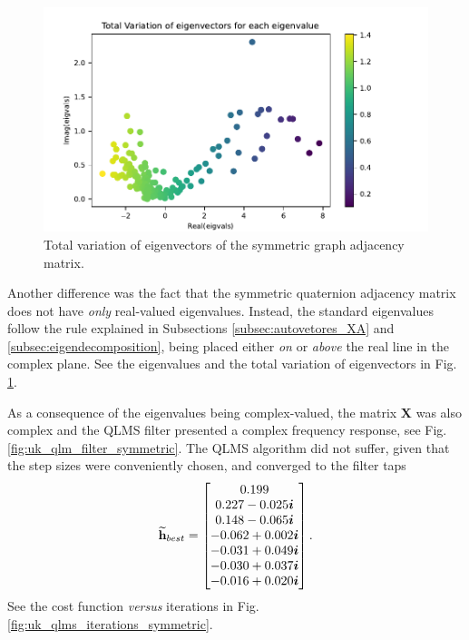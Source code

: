 \begin{figure}
    \centering
    \includegraphics[width=0.7\linewidth]{Figures/uk_example/uk_total_variation_symmetric.pdf}
    \caption{Total variation of eigenvectors of the symmetric graph adjacency matrix.}
    \label{fig:uk_total_variation_symmetric}
\end{figure}

Another difference was the fact that the symmetric quaternion adjacency matrix does not have \textit{only} real-valued eigenvalues. Instead, the standard eigenvalues follow the rule explained in Subsections \ref{subsec:autovetores_XA} and \ref{subsec:eigendecomposition}, being placed either \textit{on} or \textit{above} the real line in the complex plane. See the eigenvalues and the total variation of eigenvectors in Fig. \ref{fig:uk_total_variation_symmetric}.

As a consequence of the eigenvalues being complex-valued, the matrix $\mathbf{X}$ was also complex and the QLMS filter presented a complex frequency response, see Fig. \ref{fig:uk_qlm_filter_symmetric}.
The QLMS algorithm did not suffer, given that the step sizes were conveniently chosen, and converged to the filter taps
\begin{equation}
    \mathbf{\widetilde{h}}_{best} =
    \begin{bmatrix}
        0.199              \\
        0.227 -0.025\boldsymbol{i}    \\
        0.148 -0.065 \boldsymbol{i}   \\
        -0.062 + 0.002 \boldsymbol{i} \\
        -0.031 + 0.049 \boldsymbol{i} \\
        -0.030 + 0.037 \boldsymbol{i} \\
        -0.016 + 0.020 \boldsymbol{i}
    \end{bmatrix}.
\end{equation}
See the cost function \textit{versus} iterations in Fig. \ref{fig:uk_qlms_iterations_symmetric}.


